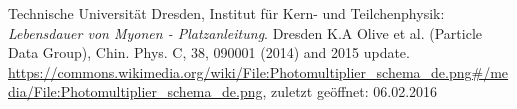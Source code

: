 \begin{thebibliography}{99}
 Technische Universität Dresden,  Institut für Kern- und Teilchenphysik: \textit{Lebensdauer von Myonen - Platzanleitung}. Dresden
 K.A Olive et al. (Particle Data Group), Chin. Phys. C, 38, 090001 (2014) and 2015 update.
 \url{https://commons.wikimedia.org/wiki/File:Photomultiplier\_schema\_de.png\#/media/File:Photomultiplier\_schema\_de.png}, zuletzt geöffnet: 06.02.2016
\end{thebibliography}

